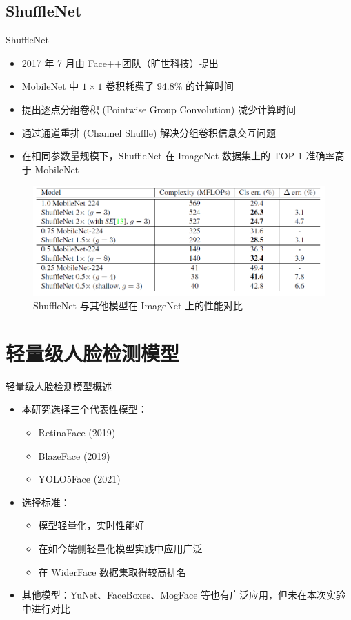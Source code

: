 \documentclass{beamer}
\begin{document}
\subsection{ShuffleNet}
\begin{frame}{ShuffleNet}

    \begin{itemize}
        \item 2017 年 7 月由 Face++团队（旷世科技）提出
        \item MobileNet 中 $1 \times 1$ 卷积耗费了 94.8\% 的计算时间
        \item 提出逐点分组卷积 (Pointwise Group Convolution) 减少计算时间
        \item 通过通道重排 (Channel Shuffle) 解决分组卷积信息交互问题
        \item 在相同参数量规模下，ShuffleNet 在 ImageNet 数据集上的 TOP-1 准确率高于 MobileNet
    \end{itemize}

    \begin{figure}
        \centering
        \includegraphics[width=0.6\linewidth]{pic/shufflenet_comp.png}
        \caption{ShuffleNet 与其他模型在 ImageNet 上的性能对比}
    \end{figure}
\end{frame}

\section{轻量级人脸检测模型}

\begin{frame}{轻量级人脸检测模型概述}
    \begin{itemize}
        \item 本研究选择三个代表性模型：
        \begin{itemize}
            \item RetinaFace (2019)
            \item BlazeFace (2019)
            \item YOLO5Face (2021)
        \end{itemize}
        \item 选择标准：
        \begin{itemize}
            \item 模型轻量化，实时性能好
            \item 在如今端侧轻量化模型实践中应用广泛
            \item 在 WiderFace 数据集取得较高排名
        \end{itemize}
        \item 其他模型：YuNet、FaceBoxes、MogFace 等也有广泛应用，但未在本次实验中进行对比
    \end{itemize}
\end{frame}
\end{document}
